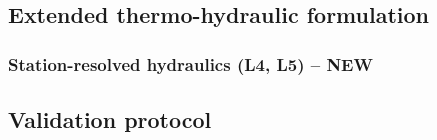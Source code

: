 \documentclass[a4paper,fleqn]{cas-dc}
\begin{document}
\subsection{Extended thermo-hydraulic formulation}

\subsubsection{Station-resolved hydraulics (L4, L5) -- NEW}

\subsection{Validation protocol}

\end{document}
